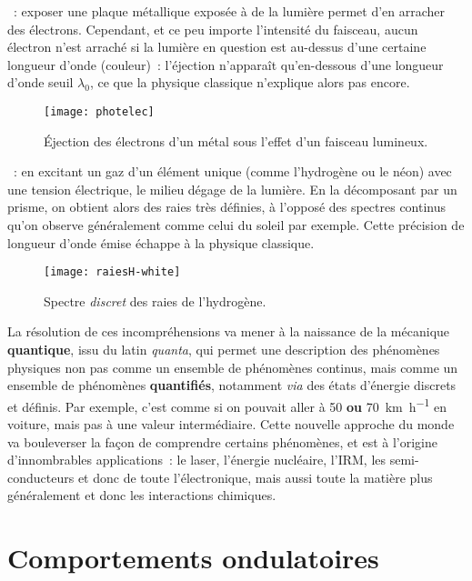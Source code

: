 \documentclass[../main/main.tex]{subfiles}
\begin{document}
\begin{itemize}[label=$\diamond$, leftmargin=10pt]
	~: exposer une plaque métallique exposée à de
	la lumière permet d'en arracher des électrons. Cependant, et ce peu importe
	l'intensité du faisceau, aucun électron n'est arraché si la lumière en
	question est au-dessus d'une certaine longueur d'onde (couleur)~: l'éjection
	n'apparaît qu'en-dessous d'une longueur d'onde seuil $\lambda_0$, ce que la
	physique classique n'explique alors pas encore.
	\begin{figure}[h!]
		\centering
		\texttt{[image: photelec]}
		\caption{Éjection des électrons d'un métal sous l'effet d'un faisceau
			lumineux.}
		\label{fig:photelec}
	\end{figure}
	~: en excitant un gaz d'un élément unique (comme
	l'hydrogène ou le néon) avec une tension électrique, le milieu dégage de la
	lumière. En la décomposant par un prisme, on obtient alors des raies très
	définies, à l'opposé des spectres continus qu'on observe généralement comme
	celui du soleil par exemple. Cette précision de longueur d'onde émise échappe
	à la physique classique.
	\begin{figure}[h!]
		\centering
		\texttt{[image: raiesH-white]}
		\caption{Spectre \textit{discret} des raies de l'hydrogène.}
		\label{fig:raiesH}
	\end{figure}
\end{itemize}
La résolution de ces incompréhensions va mener à la naissance de la mécanique
\textbf{quantique}, issu du latin \textit{quanta}, qui permet une
description des phénomènes physiques non pas comme un ensemble de phénomènes
continus, mais comme un ensemble de phénomènes \textbf{quantifiés}, notamment
\textit{via} des états d'énergie discrets et définis. Par exemple, c'est comme
si on pouvait aller à 50 \textbf{ou} \SI{70}{km.h^{-1}} en voiture, mais pas à
une valeur intermédiaire.
\bigbreak
Cette nouvelle approche du monde va bouleverser la façon de comprendre certains
phénomènes, et est à l'origine d'innombrables applications~: le laser, l'énergie
nucléaire, l'IRM, les semi-conducteurs et donc de toute l'électronique, mais
aussi toute la matière plus généralement et donc les interactions chimiques.

\section{Comportements ondulatoires}
\label{sec:mqonde}
\end{document}

